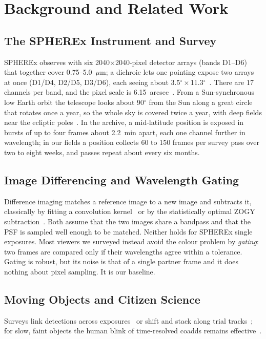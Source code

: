 \documentclass[conference]{IEEEtran}
\begin{document}
\section{Background and Related Work}

\subsection{The SPHEREx Instrument and Survey}

SPHEREx observes with six 2040$\times$2040-pixel detector arrays (bands D1--D6) that together cover 0.75--5.0~$\mu$m; a dichroic lets one pointing expose two arrays at once (D1/D4, D2/D5, D3/D6), each seeing about 3.5$^\circ\times$11.3$^\circ$~\cite{bock2026,expsupp2026}. There are 17 channels per band, and the pixel scale is 6.15~arcsec~\cite{expsupp2026}. From a Sun-synchronous low Earth orbit the telescope looks about 90$^\circ$ from the Sun along a great circle that rotates once a year, so the whole sky is covered twice a year, with deep fields near the ecliptic poles~\cite{bock2026}. In the archive, a mid-latitude position is exposed in bursts of up to four frames about 2.2~min apart, each one channel further in wavelength; in our fields a position collects 60 to 150 frames per survey pass over two to eight weeks, and passes repeat about every six months.

\subsection{Image Differencing and Wavelength Gating}

Difference imaging matches a reference image to a new image and subtracts it, classically by fitting a convolution kernel~\cite{alard1998} or by the statistically optimal ZOGY subtraction~\cite{zackay2016}. Both assume that the two images share a bandpass and that the PSF is sampled well enough to be matched. Neither holds for SPHEREx single exposures. Most viewers we surveyed instead avoid the colour problem by \emph{gating}: two frames are compared only if their wavelengths agree within a tolerance. Gating is robust, but its noise is that of a single partner frame and it does nothing about pixel sampling. It is our baseline.

\subsection{Moving Objects and Citizen Science}

Surveys link detections across exposures~\cite{holman2018} or shift and stack along trial tracks~\cite{rice2020}; for slow, faint objects the human blink of time-resolved coadds remains effective~\cite{kuchner2017,meisner2018coadds}.
\end{document}
